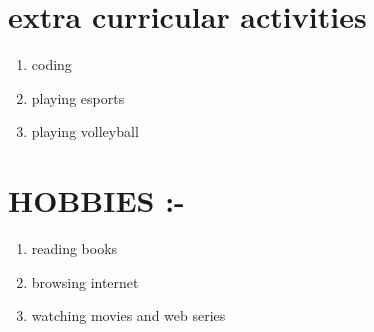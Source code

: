 \documentclass{article}
\begin{document}
\section{ \centering \color{red}  extra curricular activities} 

\begin{enumerate}
\item coding
\item playing esports
\item playing volleyball
\end{enumerate}
\section{\centering \color{red} HOBBIES :-}
\begin{enumerate}
\item reading books
\item browsing internet
\item watching movies and web series
\end{enumerate}
\end{document}
